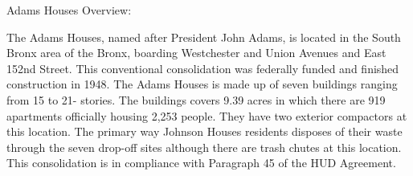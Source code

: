 Adams Houses Overview:



The Adams Houses, named after President John Adams,  is located in the South Bronx area of the Bronx, boarding Westchester and Union Avenues and East 152nd Street. This conventional consolidation was federally funded and finished construction in 1948. The Adams Houses is made up of seven buildings ranging from 15 to 21- stories.  The buildings covers 9.39 acres in which there are 919 apartments officially housing 2,253 people. They have two exterior compactors at this location. The primary way Johnson Houses residents disposes of their waste through the seven drop-off sites although there are trash chutes at this location. This consolidation is in compliance with Paragraph 45 of the HUD Agreement.